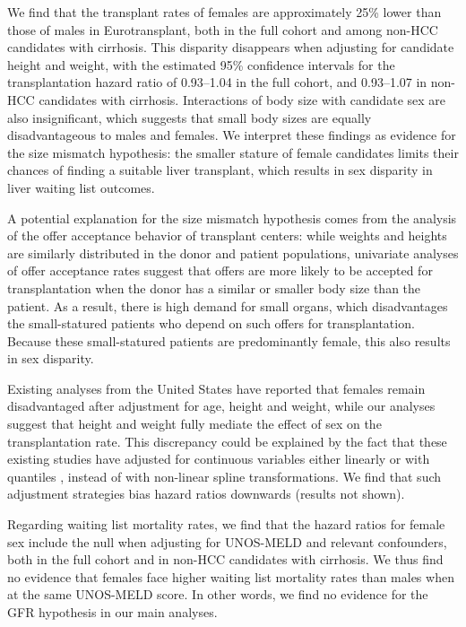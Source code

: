 \documentclass[11pt,twoside,]{book}
\begin{document}
We find that the transplant rates of females are approximately 25\%
lower than those of males in Eurotransplant, both in the full cohort
and among non-HCC candidates with cirrhosis.
This disparity disappears when adjusting for candidate height and weight, with
the estimated 95\% confidence intervals for the transplantation hazard ratio of
0.93--1.04 in the full cohort, and 0.93--1.07 in non-HCC candidates
with cirrhosis. Interactions of body
size with candidate sex are also insignificant, which suggests that small body
sizes are equally disadvantageous to males and females. We interpret these findings
as evidence for the size mismatch hypothesis: the smaller stature of female
candidates limits their chances of finding a suitable liver transplant, which results in sex disparity
in liver waiting list outcomes.

A potential explanation for the size mismatch hypothesis comes from the analysis
of the offer acceptance behavior of transplant centers: while weights and heights are similarly distributed in the donor
and patient populations, univariate analyses of offer acceptance
rates suggest that offers are more likely to be accepted for transplantation
when the donor has a similar or smaller body size than the patient. As a result,
there is high demand
for small organs, which disadvantages the small-statured patients who depend on
such offers for transplantation. Because these small-statured patients are predominantly
female, this also results in sex disparity.

Existing analyses from the United States have reported that females remain
disadvantaged after adjustment for age, height and weight, while our analyses
suggest that height and weight fully mediate the effect of sex on the transplantation
rate. This discrepancy could be explained by the fact that these existing
studies have adjusted for continuous variables either linearly
\citep{mathurSexBasedDisparitiesLiver2011, lockeQuantifyingSexBasedDisparities2020a} or with quantiles \citep{laiHeightContributesGender2010, nephewExceptionPointsBody2017},
instead of with non-linear spline transformations. We find that such
adjustment strategies bias hazard ratios downwards (results not shown).

Regarding waiting list mortality rates, we find that the hazard ratios for female
sex include the null when adjusting for UNOS-MELD and relevant confounders,
both in the full cohort and in non-HCC candidates with cirrhosis. We thus find
no evidence that females face higher waiting list mortality rates than males when
at the same UNOS-MELD score. In other words, we find no evidence for the
GFR hypothesis in our main analyses.
\newpage
\end{document}
